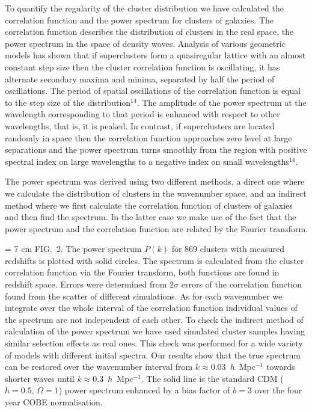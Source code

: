 To quantify the regularity of the cluster distribution we have
calculated the correlation function and the power spectrum for
clusters of galaxies.  The correlation function describes the
distribution of clusters in the real space, the power spectrum in the
 space of density waves.  Analysis of various geometric 
models has shown that if superclusters form a quasiregular lattice
with an almost constant step size then the cluster correlation function is
oscillating, it has alternate secondary maxima and minima, separated
by half the period of oscillations. The period of spatial oscillations
of the correlation function is equal to the step size of the
distribution$^{14}$.  The amplitude of the power spectrum at the
wavelength corresponding to that period is enhanced with respect to
other wavelengths, that is, it is peaked. In contrast, if superclusters
are located randomly in space then the correlation function approaches
zero level at large separations and the power spectrum turns smoothly
from the region with positive spectral index on large wavelengths to a
negative index on small wavelengths$^{14}$.


 The power spectrum was derived using two
different methods, a direct one where we calculate the distribution of
clusters in the wavenumber space, and an indirect method where we
first calculate the correlation function of clusters of galaxies and
then find the spectrum. In the latter case we make use of the fact
that the power spectrum and the correlation function are related by
the Fourier transform.

\midinsert
\vskip 20mm
{\epsfysize= 7 cm }
\noi
{ FIG.~2.} The power spectrum $P(k)$ for 869 clusters with measured
redshifts is plotted with solid circles. The spectrum is calculated
from the cluster correlation function via the Fourier transform,
both functions are found in redshift space.
Errors were determined from $2\sigma$ errors of the correlation
function found from the scatter of different simulations. 
As for each wavenumber we integrate over the whole interval of the
correlation function individual values of the spectrum are not
independent of each other. To check the indirect method of calculation
of the power spectrum we have used simulated cluster samples having
similar selection effects as real ones. This check was performed for a
wide variety of models with different initial spectra. Our results
show that the true spectrum can be restored over the wavenumber
interval from $k\approx 0.03$~$h$~Mpc$^{-1}$ towards shorter waves
until $k\approx 0.3$~$h$~Mpc$^{-1}$.  The solid line is the standard
CDM ($h =0.5$, $\Omega = 1$) power spectrum enhanced by a bias
factor of $b=3$ over the four year COBE normalisation.
\endinsert



